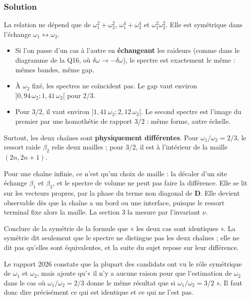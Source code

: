 \documentclass[11pt,a4paper]{article}
\providecommand{\tightlist}{\setlength{\itemsep}{0pt}\setlength{\parskip}{0pt}}
\begin{document}
\hypertarget{solution-14}{%
\subsubsection{Solution}\label{solution-14}}

La relation ne dépend que de \(\omega_1^2+\omega_2^2\), \(\omega_1^4+\omega_2^4\) et \(\omega_1^2\omega_2^2\). Elle est symétrique dans l'échange \(\omega_1\leftrightarrow\omega_2\).

\begin{itemize}
\tightlist
\item
  Si l'on passe d'un cas à l'autre en \textbf{échangeant} les raideurs (comme dans le diagramme de la Q16, où \(\delta\omega\to-\delta\omega\)), le spectre est exactement le même : mêmes bandes, même gap.
\item
  À \(\omega_2\) fixé, les spectres ne coïncident pas. Le gap vaut environ \(]0{,}94\,\omega_2;1{,}41\,\omega_2[\) pour \(2/3\).
\item
  Pour \(3/2\), il vaut environ \(]1{,}41\,\omega_2;2{,}12\,\omega_2[\). Le second spectre est l'image du premier par une homothétie de rapport \(3/2\) : même forme, autre échelle.
\end{itemize}

Surtout, les deux chaînes sont \textbf{physiquement différentes}. Pour \(\omega_1/\omega_2=2/3\), le ressort raide \(\beta_2\) relie deux mailles ; pour \(3/2\), il est à l'intérieur de la maille \((2n,2n+1)\).

Pour une chaîne infinie, ce n'est qu'un choix de maille : la décaler d'un site échange \(\beta_1\) et \(\beta_2\), et le spectre de volume ne peut pas faire la différence. Elle se lit sur les vecteurs propres, par la phase du terme non diagonal de \(\mathbf D\). Elle devient observable dès que la chaîne a un bord ou une interface, puisque le ressort terminal fixe alors la maille. La section 3 la mesure par l'invariant \(\nu\).

\begin{piege}

Conclure de la symétrie de la formule que « les deux cas sont identiques ». La symétrie dit seulement que le spectre ne distingue pas les deux chaînes ; elle ne dit pas qu'elles sont équivalentes, et la suite du sujet repose sur leur différence.

\end{piege}

\begin{jury}

Le rapport 2026 constate que la plupart des candidats ont vu le rôle symétrique de \(\omega_1\) et \(\omega_2\), mais ajoute qu'« il n'y a aucune raison pour que l'estimation de \(\omega_2\) dans le cas où \(\omega_1/\omega_2 = 2/3\) donne le même résultat que si \(\omega_1/\omega_2 = 3/2\) ». Il faut donc dire précisément ce qui est identique et ce qui ne l'est pas.

\end{jury}
\end{document}
